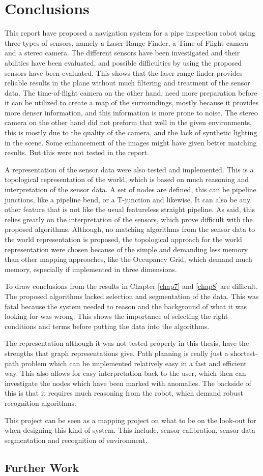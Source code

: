 
\chapter{Conclusions}
\label{chap9}
This report have proposed a navigation system for a pipe inspection robot using three
types of sensors, namely a Laser Range Finder, a Time-of-Flight camera and a stereo
camera. The different sensors have been investigated and their abilities have been
evaluated, and possible difficulties by using the proposed sensors have been evaluated.
This shows that the laser range finder provides reliable results in the plane without much
filtering and treatment of the sensor data. The time-of-flight camera on the other hand,
need more preparation before it can be utilized to create a map of the surroundings,
mostly because it provides more denser information, and this information is more prone to
noise. The stereo camera on the other hand did not preform that well in the given
environments, this is mostly due to the quality of the camera, and the lack of synthetic
lighting in the scene. Some enhancement of the images might have given better matching
results. But this were not tested in the report. 

A representation of the sensor data were also tested and implemented. This is a
topological representation of the world, which is based on much reasoning and
interpretation of the sensor data. A set of nodes are defined, this can be pipeline
junctions, like a pipeline bend, or a T-junction and likewise. It can also be any other
feature that is not like the usual featureless straight pipeline. As said, this relies
greatly on the interpretation of the sensors, which prove difficult with the proposed
algorithms. Although, no matching algorithms from the sensor data to the world
representation is proposed, the topological approach for the world representation were
chosen because of the simple and demanding less memory than other mapping approaches, like
the Occupancy Grid, which demand much memory, especially if implemented in three
dimensions. 


To draw conclusions from the results in Chapter \ref{chap7} and \ref{chap8} are difficult.
The proposed algorithms lacked selection and segmentation of the data. This was fatal
because the system needed to reason and the background of what it was looking for was
wrong. This shows the importance of selecting the right conditions and terms before
putting the data into the algorithms.

The representation although it was not tested properly in this thesis, have
the strengths that graph representations give. Path planning is
really just a shortest-path problem which can be implemented relatively easy in a fast and
efficient way. This also allows for easy interpretation back to the user, which then can
investigate the nodes which have been marked with anomalies. The backside of this is that
it requires much reasoning from the robot, which demand robust recognition algorithms.


This project can be seen as a mapping project on what to be on the look-out for when
designing this kind of system. This include, sensor calibration, sensor data
segmentation and recognition of environment.



\section{Further Work}


